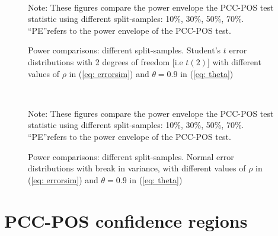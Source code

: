 \documentclass[harvard,11pt]{article}
\begin{document}
\begin{figure}[tbph]
\caption{Power comparisons: different split-samples. Student's $t$ error distributions with 2 degrees of freedom [i.e $t(2)$] with
different values of $\rho $ in (\ref{eq: errorsim}) and $\theta =0.9$ in (\ref{eq: theta})}
\begin{center}
 \\[0pt]
\end{center}
\doublespacing
Note: These figures compare the power
envelope the PCC-POS test statistic using different split-samples: 10\%, 30\%, 50\%, 70\%. \textquotedblleft PE\textquotedblright refers to the power envelope of the PCC-POS test.
\label{fig: Power comparaison using different tests Normal}
\end{figure}


\begin{figure}[tbph]
\caption{Power comparisons: different split-samples. Normal error distributions with break in variance, with
different values of $\rho $ in (\ref{eq: errorsim}) and $\theta =0.9$ in (\ref{eq: theta})}
\begin{center}
 \\[0pt]
\end{center}
\doublespacing
Note: These figures compare the power
envelope the PCC-POS test statistic using different split-samples: 10\%, 30\%, 50\%, 70\%. \textquotedblleft PE\textquotedblright refers to the power envelope of the PCC-POS test.
\label{fig: SS410}
\end{figure}
\section{PCC-POS confidence regions \label{projectiontechniqueC3}}
\end{document}
